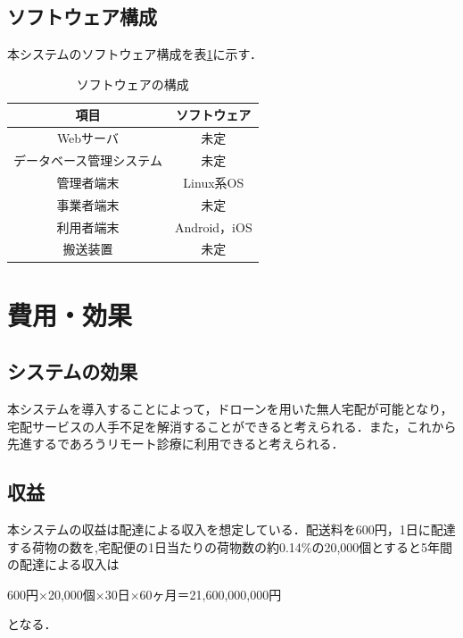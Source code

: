 \documentclass[a4paper, titlepage]{jsarticle}
\begin{document}
\subsection{ソフトウェア構成}
本システムのソフトウェア構成を表\ref{fig:software}に示す．
\begin{table}[H]
 \begin{center}
  \caption{ソフトウェアの構成}
    \label{fig:software}
  \begin{tabular}{cc} \hline
    項目 & ソフトウェア \\ \hline \hline
    Webサーバ & 未定 \\
    データベース管理システム & 未定 \\
    管理者端末 & Linux系OS \\
    事業者端末 & 未定 \\
    利用者端末 & Android，iOS \\
    搬送装置 & 未定 \\ \hline
  \end{tabular}
 \end{center}
\end{table}

\section{費用・効果}
\subsection{システムの効果}
本システムを導入することによって，ドローンを用いた無人宅配が可能となり，宅配サービスの人手不足を解消することができると考えられる．また，これから先進するであろうリモート診療に利用できると考えられる．

\subsection{収益}
本システムの収益は配達による収入を想定している．配送料を600円，1日に配達する荷物の数を,宅配便の1日当たりの荷物数の約0.14\%の20,000個とすると5年間の配達による収入は
\begin{center}
    600円×20,000個×30日×60ヶ月＝21,600,000,000円
\end{center}
となる．
\end{document}
